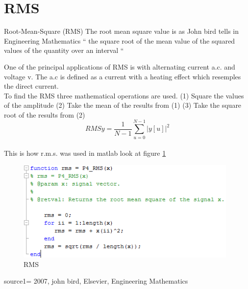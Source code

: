 \section{RMS}
Root-Mean-Square (RMS)
The root mean square value is as John bird tells in Engineering Mathematics \citep{Bird2007
} “ the square root of the mean value of the squared values of the quantity over an interval “

One of the principal applications of RMS is with alternating current a.c. and voltage v. The a.c is defined as a current with a heating effect which resemples the direct current. \citep{Bird2007}
\\
To find the RMS three mathematical operations are used.
(1)	Square the values of the amplitude
(2)	Take the mean of the results from (1)
(3)	Take the square root of the results from (2)
\begin{equation}\label{eq:RMS formular}
RMSy = \frac{1}{N-1}\sum_{u=0}^{N-1}|y[u]|^2
\end{equation}
\\
This is how r.m.s. was used in matlab look at figure \ref{RMS}
\begin{figure}
	\begin{center}
		\includegraphics[height=5cm]{fig/RMS_matlabCode.png}
		\caption{RMS}
		\label{RMS}
	\end{center}
\end{figure}

source1= 2007, john bird, Elsevier, Engineering Mathematics